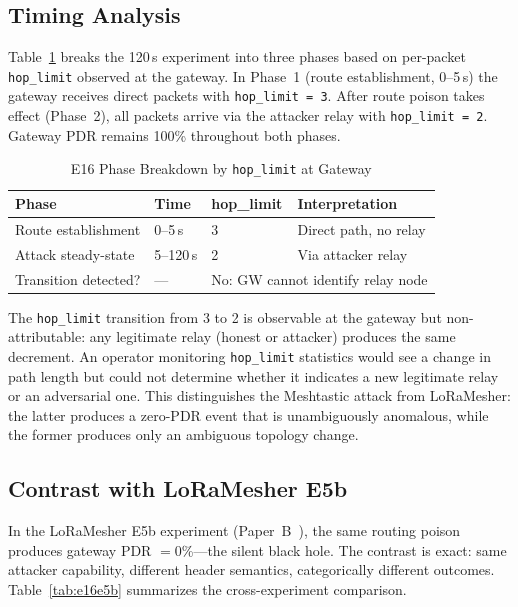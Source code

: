 \documentclass[journal]{IEEEtran}
\begin{document}
\subsection{Timing Analysis}

Table~\ref{tab:e16-timing} breaks the 120\,s experiment into three phases
based on per-packet \texttt{hop\_limit} observed at the gateway. In Phase~1
(route establishment, 0--5\,s) the gateway receives direct packets with
\texttt{hop\_limit = 3}. After route poison takes effect (Phase~2), all packets
arrive via the attacker relay with \texttt{hop\_limit = 2}. Gateway PDR remains
100\% throughout both phases.

\begin{table}[h]
  \centering
  \caption{E16 Phase Breakdown by \texttt{hop\_limit} at Gateway}
  \label{tab:e16-timing}
  \begin{tabular}{llll}
    \toprule
    Phase & Time & hop\_limit & Interpretation \\
    \midrule
    Route establishment & 0--5\,s   & 3 & Direct path, no relay \\
    Attack steady-state  & 5--120\,s & 2 & Via attacker relay \\
    Transition detected? & ---       & \multicolumn{2}{l}{No: GW cannot identify relay node} \\
    \bottomrule
  \end{tabular}
\end{table}

The \texttt{hop\_limit} transition from 3 to 2 is observable at the gateway
but non-attributable: any legitimate relay (honest or attacker) produces
the same decrement. An operator monitoring \texttt{hop\_limit} statistics
would see a change in path length but could not determine whether it
indicates a new legitimate relay or an adversarial one. This distinguishes
the Meshtastic attack from LoRaMesher: the latter produces a zero-PDR
event that is unambiguously anomalous, while the former produces only an
ambiguous topology change.

\subsection{Contrast with LoRaMesher E5b}

In the LoRaMesher E5b experiment (Paper~B~\cite{paperb}), the same routing
poison produces gateway PDR $= 0$\%---the silent black hole. The contrast
is exact: same attacker capability, different header semantics, categorically
different outcomes. Table~\ref{tab:e16e5b} summarizes the cross-experiment
comparison.
\end{document}

